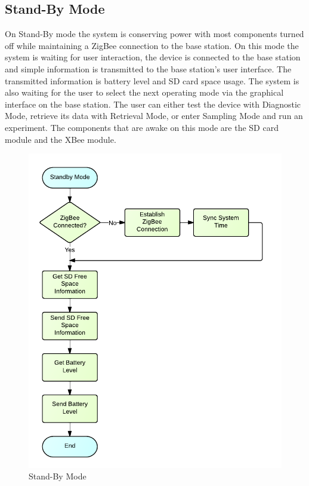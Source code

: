 \subsection{Stand-By Mode}
On Stand-By mode the system is conserving power with most components turned off while maintaining a ZigBee connection to the base station. On this mode the system is waiting for user interaction, the device is connected to the base station and simple information is transmitted to the base station's user interface. The transmitted information is battery level and SD card space usage. The system is also waiting for the user to select the next operating mode via the graphical interface on the base station. The user can either test the device with Diagnostic Mode, retrieve its data with Retrieval Mode, or enter Sampling Mode and run an experiment. The components that are awake on this mode are the SD card module and the XBee module.
\begin{figure}[H]
	\centering
	\includegraphics[scale=1.0]{img/StandByMode}
	\caption{Stand-By Mode \label{fig:standByMode}}
\end{figure}

